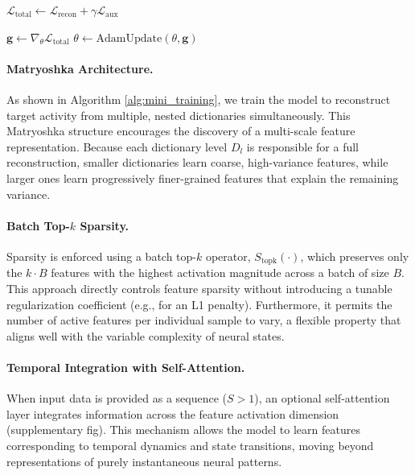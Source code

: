 \begin{algorithm}[h!]
\begin{algorithmic}[1]
    \State $\mathcal{L}_{\text{total}} \gets \mathcal{L}_{\text{recon}} + \gamma \mathcal{L}_{\text{aux}}$
    
    \Statex {}
    \State $\mathbf{g} \gets \nabla_{\theta} \mathcal{L}_{\text{total}}$ 
    \State $\theta \gets \text{AdamUpdate}(\theta, \mathbf{g})$ 
\EndProcedure
\end{algorithmic}
\end{algorithm}

\paragraph{Matryoshka Architecture.}
As shown in Algorithm \ref{alg:mini_training}, we train the model to reconstruct target activity from multiple, nested dictionaries simultaneously. This Matryoshka structure \cite{bussmann_2025_msae} encourages the discovery of a multi-scale feature representation. Because each dictionary level $D_l$ is responsible for a full reconstruction, smaller dictionaries learn coarse, high-variance features, while larger ones learn progressively finer-grained features that explain the remaining variance.

\paragraph{Batch Top-$k$ Sparsity.}
Sparsity is enforced using a batch top-$k$ operator, $S_{\text{topk}}(\cdot)$, which preserves only the $k \cdot B$ features with the highest activation magnitude across a batch of size $B$. This approach directly controls feature sparsity without introducing a tunable regularization coefficient (e.g., for an L1 penalty). Furthermore, it permits the number of active features per individual sample to vary, a flexible property that aligns well with the variable complexity of neural states.

\paragraph{Temporal Integration with Self-Attention.}
When input data is provided as a sequence ($S>1$), an optional self-attention layer integrates information across the feature activation dimension (supplementary fig). This mechanism allows the model to learn features corresponding to temporal dynamics and state transitions, moving beyond representations of purely instantaneous neural patterns.

